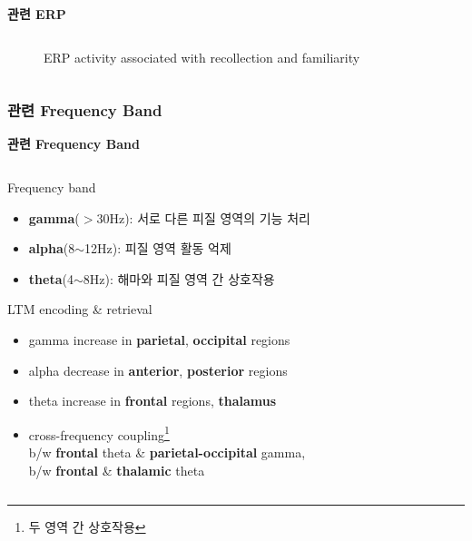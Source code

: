 \documentclass{beamer}
\begin{document}
\begin{frame}{\textbf{관련 ERP}}
\begin{columns}
\begin{column}{0.48\textwidth}
\begin{figure}
        \caption{ERP activity associated with recollection and familiarity}
      \end{figure}
    \end{column}
  \end{columns}
\end{frame}

\subsubsection{관련 Frequency Band}
\begin{frame}{\textbf{관련 Frequency Band}}
  \begin{columns}
    \begin{column}{0.58\textwidth}
      \begin{block}{Frequency band}
        \begin{itemize}
          \item \textbf{gamma}($>$30Hz): 서로 다른 피질 영역의 기능 처리 
          \item \textbf{alpha}(8$\sim$12Hz): 피질 영역 활동 억제
          \item \textbf{theta}(4$\sim$8Hz): 해마와 피질 영역 간 상호작용
        \end{itemize}
      \end{block}
      \begin{block}{LTM encoding \& retrieval}
        \begin{itemize}
          \item gamma increase in \textbf{parietal}, \textbf{occipital} regions
          \item alpha decrease in \textbf{anterior}, \textbf{posterior} regions
          \item theta increase in \textbf{frontal} regions, \textbf{thalamus}
          \item cross-frequency coupling\footnote{두 영역 간 상호작용} \\b/w \textbf{frontal} theta \& \textbf{parietal-occipital} gamma,\\b/w \textbf{frontal} \& \textbf{thalamic} theta
        \end{itemize}
      \end{block}
    \end{column}
    \hfill
    \begin{column}{0.38\textwidth}
      \begin{figure}
        \centering

\end{figure}
\end{column}
\end{columns}
\end{frame}
\end{document}
